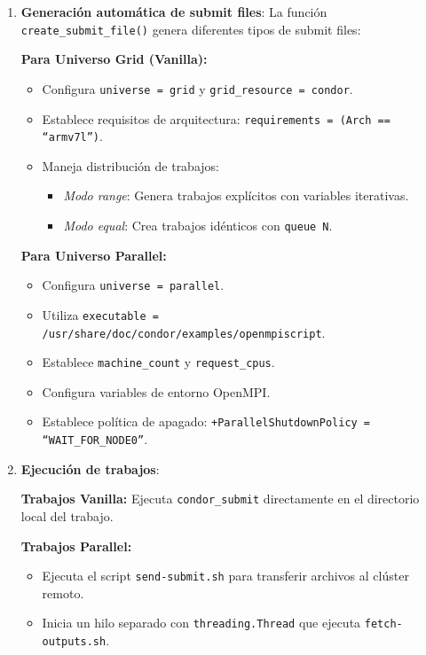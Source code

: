\begin{enumerate}
	\item \textbf{Generación automática de submit files}: La función \texttt{create\_submit\_file()} genera diferentes tipos de submit files:

	      \textbf{Para Universo Grid (Vanilla):}
	      \begin{itemize}
		      \item Configura \texttt{universe = grid} y \texttt{grid\_resource = condor}.
		      \item Establece requisitos de arquitectura: \texttt{requirements = (Arch == ``armv7l'')}.
		      \item Maneja distribución de trabajos:
		            \begin{itemize}
			            \item \textit{Modo range}: Genera trabajos explícitos con variables iterativas.
			            \item \textit{Modo equal}: Crea trabajos idénticos con \texttt{queue N}.
		            \end{itemize}
	      \end{itemize}

	      \textbf{Para Universo Parallel:}
	      \begin{itemize}
		      \item Configura \texttt{universe = parallel}.
		      \item Utiliza \texttt{executable = /usr/share/doc/condor/examples/openmpiscript}.
		      \item Establece \texttt{machine\_count} y \texttt{request\_cpus}.
		      \item Configura variables de entorno OpenMPI.
		      \item Establece política de apagado: \texttt{+ParallelShutdownPolicy = ``WAIT\_FOR\_NODE0''}.
	      \end{itemize}

	\item \textbf{Ejecución de trabajos}:

	      \textbf{Trabajos Vanilla:} Ejecuta \texttt{condor\_submit} directamente en el directorio local del trabajo.

	      \textbf{Trabajos Parallel:} 
	      \begin{itemize}
		      \item Ejecuta el script \texttt{send-submit.sh} para transferir archivos al clúster remoto.
		      \item Inicia un hilo separado con \texttt{threading.Thread} que ejecuta \texttt{fetch-outputs.sh}.
	      \end{itemize}


\end{enumerate}
